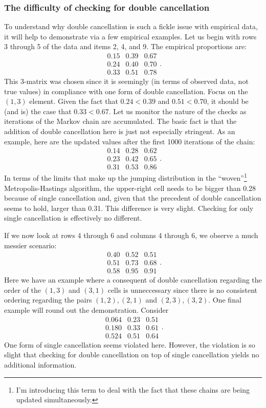 \documentclass[12pt]{article}
\begin{document}
\subsubsection{The difficulty of checking for double cancellation}
To understand why double cancellation is such a fickle issue with empirical data, it will help to demonstrate via a few empirical examples. Let us begin with rows 3 through 5 of the  data and items 2, 4, and 9. The empirical proportions are:
\[
\begin{array}{ccc}
0.15& 0.39& 0.67 \\
0.24 &0.40 &0.70 \\
 0.33& 0.51& 0.78 
\end{array}.
\]
This 3-matrix was chosen since it is seemingly (in terms of observed data, not true values) in compliance with one form of double cancellation. Focus on the $(1,3)$ element. Given the fact that $0.24<0.39$ and $0.51<0.70$, it should be (and is) the case that $0.33<0.67$. Let us monitor the nature of the checks as iterations of the Markov chain are accumulated. The basic fact is that the addition of double cancellation here is just not especially stringent. As an example, here are the updated values after the first 1000 iterations of the chain:
\[
\begin{array}{ccc}
0.14 &0.28& 0.62 \\
 0.23& 0.42& 0.65 \\
 0.31& 0.53& 0.86
\end{array}.
\]
In terms of the limits that make up the jumping distribution in the ``woven''\footnote{I'm introducing this term to deal with the fact that these chains are being updated simultaneously.} Metropolis-Hastings algorithm, the upper-right cell needs to be bigger than 0.28 because of single cancellation and, given that the precedent of double cancellation seems to hold, larger than 0.31. This difference is very slight. Checking for only single cancellation is effectively no different.

If we now look at rows 4 through 6 and columns 4 through 6, we observe a much messier scenario:
\[
\begin{array}{ccc}
 0.40& 0.52& 0.51 \\
 0.51& 0.73& 0.68 \\
 0.58& 0.95& 0.91
\end{array}.
\]
Here we have an example where a consequent of double cancellation regarding the order of the $(1,3)$ and $(3,1)$ cells is unneccessary since there is no consistent ordering regarding the pairs $(1,2),(2,1)$ and $(2,3), (3,2)$. One final example will round out the demonstration. Consider
\[
\begin{array}{ccc}
0.064 &0.23 &0.51 \\
0.180 &0.33 &0.61 \\
0.524& 0.51& 0.64
\end{array}.
\]
One form of single cancellation seems violated here. However, the violation is so slight that checking for double cancellation on top of single cancellation yields no additional information. 
\end{document}

